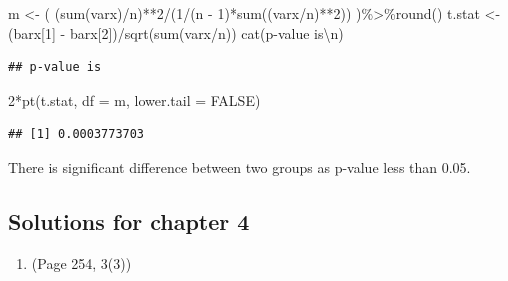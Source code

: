 \documentclass{article}
\newenvironment{Shaded}{\begin{snugshade}}{\end{snugshade}}
\newcommand{\AttributeTok}[1]{\textcolor[rgb]{0.77,0.63,0.00}{#1}}
\newcommand{\ConstantTok}[1]{\textcolor[rgb]{0.00,0.00,0.00}{#1}}
\newcommand{\DecValTok}[1]{\textcolor[rgb]{0.00,0.00,0.81}{#1}}
\newcommand{\FunctionTok}[1]{\textcolor[rgb]{0.00,0.00,0.00}{#1}}
\newcommand{\NormalTok}[1]{#1}
\newcommand{\OtherTok}[1]{\textcolor[rgb]{0.56,0.35,0.01}{#1}}
\newcommand{\SpecialCharTok}[1]{\textcolor[rgb]{0.00,0.00,0.00}{#1}}
\newcommand{\StringTok}[1]{\textcolor[rgb]{0.31,0.60,0.02}{#1}}
\begin{document}
\begin{Shaded}
\begin{Highlighting}[]
\NormalTok{m }\OtherTok{\textless{}{-}}\NormalTok{ ( (}\FunctionTok{sum}\NormalTok{(varx)}\SpecialCharTok{/}\NormalTok{n)}\SpecialCharTok{**}\DecValTok{2}\SpecialCharTok{/}\NormalTok{(}\DecValTok{1}\SpecialCharTok{/}\NormalTok{(n }\SpecialCharTok{{-}} \DecValTok{1}\NormalTok{)}\SpecialCharTok{*}\FunctionTok{sum}\NormalTok{((varx}\SpecialCharTok{/}\NormalTok{n)}\SpecialCharTok{**}\DecValTok{2}\NormalTok{)) )}\SpecialCharTok{\%\textgreater{}\%}\FunctionTok{round}\NormalTok{()}
\NormalTok{t.stat }\OtherTok{\textless{}{-}}\NormalTok{ (barx[}\DecValTok{1}\NormalTok{] }\SpecialCharTok{{-}}\NormalTok{ barx[}\DecValTok{2}\NormalTok{])}\SpecialCharTok{/}\FunctionTok{sqrt}\NormalTok{(}\FunctionTok{sum}\NormalTok{(varx}\SpecialCharTok{/}\NormalTok{n))}
\FunctionTok{cat}\NormalTok{(}\StringTok{\textquotesingle{}p{-}value is}\SpecialCharTok{\textbackslash{}n}\StringTok{\textquotesingle{}}\NormalTok{)}
\end{Highlighting}
\end{Shaded}

\begin{verbatim}
## p-value is
\end{verbatim}

\begin{Shaded}
\begin{Highlighting}[]
\DecValTok{2}\SpecialCharTok{*}\FunctionTok{pt}\NormalTok{(t.stat, }\AttributeTok{df =}\NormalTok{ m, }\AttributeTok{lower.tail =} \ConstantTok{FALSE}\NormalTok{)}
\end{Highlighting}
\end{Shaded}

\begin{verbatim}
## [1] 0.0003773703
\end{verbatim}

There is significant difference between two groups as p-value less than
0.05.

\hypertarget{solutions-for-chapter-4}{%
\subsection{Solutions for chapter 4}\label{solutions-for-chapter-4}}

\begin{enumerate}
\def\labelenumi{\arabic{enumi}.}
\tightlist
\item
  (Page 254, 3(3))
\end{enumerate}
\end{document}
